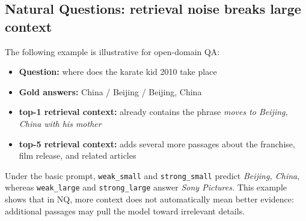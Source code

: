 \documentclass[a4paper,12pt]{article}
\begin{document}
\subsection{Natural Questions: retrieval noise breaks large context}
The following example is illustrative for open-domain QA:
\begin{itemize}
    \item \textbf{Question:} where does the karate kid 2010 take place
    \item \textbf{Gold answers:} China / Beijing / Beijing, China
    \item \textbf{top-1 retrieval context:} already contains the phrase \textit{moves to Beijing, China with his mother}
    \item \textbf{top-5 retrieval context:} adds several more passages about the franchise, film release, and related articles
\end{itemize}
Under the basic prompt, \texttt{weak\_small} and \texttt{strong\_small} predict \textit{Beijing, China}, whereas \texttt{weak\_large} and \texttt{strong\_large} answer \textit{Sony Pictures.} This example shows that in NQ, more context does not automatically mean better evidence: additional passages may pull the model toward irrelevant details.
\end{document}
